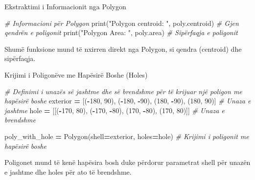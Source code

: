 \documentclass[
  ignorenonframetext,
]{beamer}
\newenvironment{Shaded}{\begin{snugshade}}{\end{snugshade}}
\newcommand{\BuiltInTok}[1]{#1}
\newcommand{\CommentTok}[1]{\textcolor[rgb]{0.56,0.35,0.01}{\textit{#1}}}
\newcommand{\DecValTok}[1]{\textcolor[rgb]{0.00,0.00,0.81}{#1}}
\newcommand{\NormalTok}[1]{#1}
\newcommand{\OperatorTok}[1]{\textcolor[rgb]{0.81,0.36,0.00}{\textbf{#1}}}
\newcommand{\StringTok}[1]{\textcolor[rgb]{0.31,0.60,0.02}{#1}}
\begin{document}
\begin{frame}[fragile]{Ekstraktimi i Informacionit nga Polygon}
\protect\hypertarget{ekstraktimi-i-informacionit-nga-polygon}{}

\begin{Shaded}
\begin{Highlighting}[]
\CommentTok{\# Informacioni për Polygon}
\BuiltInTok{print}\NormalTok{(}\StringTok{"Polygon centroid: "}\NormalTok{, poly.centroid)  }\CommentTok{\# Gjen qendrën e poligonit}
\BuiltInTok{print}\NormalTok{(}\StringTok{"Polygon Area: "}\NormalTok{, poly.area)  }\CommentTok{\# Sipërfaqja e poligonit}
\end{Highlighting}
\end{Shaded}

Shumë funksione mund të nxirren direkt nga Polygon, si qendra (centroid)
dhe sipërfaqja.
\end{frame}

\begin{frame}[fragile]{Krijimi i Poligonëve me Hapësirë Boshe (Holes)}
\protect\hypertarget{krijimi-i-poligonuxebve-me-hapuxebsiruxeb-boshe-holes}{}

\begin{Shaded}
\begin{Highlighting}[]
\CommentTok{\# Definimi i unazës së jashtme dhe së brendshme për të krijuar një poligon me hapësirë boshe}
\NormalTok{exterior }\OperatorTok{=}\NormalTok{ [(}\OperatorTok{{-}}\DecValTok{180}\NormalTok{, }\DecValTok{90}\NormalTok{), (}\OperatorTok{{-}}\DecValTok{180}\NormalTok{, }\OperatorTok{{-}}\DecValTok{90}\NormalTok{), (}\DecValTok{180}\NormalTok{, }\OperatorTok{{-}}\DecValTok{90}\NormalTok{), (}\DecValTok{180}\NormalTok{, }\DecValTok{90}\NormalTok{)]  }\CommentTok{\# Unaza e jashtme}
\NormalTok{hole }\OperatorTok{=}\NormalTok{ [[(}\OperatorTok{{-}}\DecValTok{170}\NormalTok{, }\DecValTok{80}\NormalTok{), (}\OperatorTok{{-}}\DecValTok{170}\NormalTok{, }\OperatorTok{{-}}\DecValTok{80}\NormalTok{), (}\DecValTok{170}\NormalTok{, }\OperatorTok{{-}}\DecValTok{80}\NormalTok{), (}\DecValTok{170}\NormalTok{, }\DecValTok{80}\NormalTok{)]]  }\CommentTok{\# Unaza e brendshme}

\NormalTok{poly\_with\_hole }\OperatorTok{=}\NormalTok{ Polygon(shell}\OperatorTok{=}\NormalTok{exterior, holes}\OperatorTok{=}\NormalTok{hole)  }\CommentTok{\# Krijimi i poligonit me hapësirë boshe}
\end{Highlighting}
\end{Shaded}

Poligonet mund të kenë hapësira bosh duke përdorur parametrat shell për
unazën e jashtme dhe holes për ato të brendshme.
\end{frame}
\end{document}
